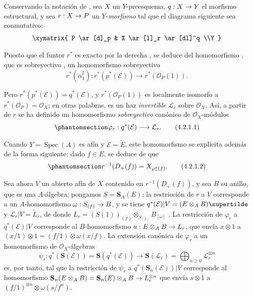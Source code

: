 \documentclass[oneside,10pt]{amsart}
\makeatletter
\renewcommand{\geq}{\geqslant}
\newcommand{\ega@arrow}[2]{\mathchoice{#1}{#2}{#2}{#2}}
\renewcommand{\to}{\ega@arrow{\longrightarrow}{\rightarrow}}
\newcommand{\oldpage}[2][]{\marginnote{\normalfont\footnotesize\textbf{#1}~|~#2}\ignorespaces}
\let\EGAOriginalLabel\label
\renewcommand{\label}[1]{\phantomsection\EGAOriginalLabel{#1}}
\makeatother
\begin{document}
\begin{env}[4.2.1]
\label{II.4.2.1-fr}
Conservando la notación de , sea $X$ un $Y$-preesquema, $q:X\to Y$ el morfismo estructural, y sea $r:X\to P$ un $Y$-\emph{morfismo} tal que el diagrama siguiente sea conmutativo:
\[
  \xymatrix{
    P \ar[d]_p & X \ar[l]_r \ar[dl]^q
    \\Y
  }
\]
\oldpage[II]{73}

Puesto que el funtor $r^*$ es exacto por la derecha , se deduce del homomorfismo , que es sobreyectivo , un homomorfismo sobreyectivo
\[
  r^*(\alpha_1^\sharp):r^*(p^*(\mathcal{E}))\longrightarrow
  r^*(\mathcal{O}_P(1)).
\]

Pero $r^*(p^*(\mathcal{E}))=q^*(\mathcal{E})$, y $r^*(\mathcal{O}_P(1))$ es localmente isomorfo a $r^*(\mathcal{O}_P)=\mathcal{O}_X$; en otras palabras, es un haz \emph{invertible} $\mathcal{L}_r$ sobre $\mathcal{O}_X$.
Así, a partir de $r$ se ha definido un homomorfismo \emph{sobreyectivo} canónico de $\mathcal{O}_X$-módulos
\[
\label{II.4.2.1.1-fr}
  \varphi_r:q^*(\mathcal{E})\longrightarrow\mathcal{L}_r.
\tag{4.2.1.1}
\]

Cuando $Y=\operatorname{Spec}(A)$ es afín y $\mathcal{E}=\widetilde{E}$, este homomorfismo se explicita además de la forma siguiente: dado $f\in E$, se deduce de  que
\[
\label{II.4.2.1.2-fr}
  r^{-1}(D_+(f))=X_{\varphi_r^\flat(f)}.
\tag{4.2.1.2}
\]

Sea ahora $V$ un abierto afín de $X$ contenido en $r^{-1}(D_+(f))$, y sea $B$ su anillo, que es una $A$-álgebra;
pongamos $S=\mathbf{S}_A(E)$;
la restricción de $r$ a $V$ corresponde a un $A$-homomorfismo $\omega:S_{(f)}\to B$, y se tiene $q^*(\mathcal{E})|V=(E\otimes_A B)\supertilde$ y $\mathcal{L}_r|V=\widetilde{L}_r$, de donde $L_r=(S(1))_{(f)}\otimes_{S_{(f)}}B_{[\omega]}$ .
La restricción de $\varphi_r$ a $q^*(\mathcal{E})|V$ corresponde al $B$-homomorfismo $u:E\otimes_A B\to L_r$, que envía $x\otimes1$ a $(x/1)\otimes1=(f/1)\otimes\omega(x/f)$.
La extensión canónica de $\varphi_r$ a un homomorfismo de $\mathcal{O}_X$-álgebras
\[
  \psi_r:q^*(\mathbf{S}(\mathcal{E}))=
  \mathbf{S}(q^*(\mathcal{E}))\longrightarrow
  \mathbf{S}(\mathcal{L}_r)=\bigoplus_{n\geq0}\mathcal{L}_r^{\otimes n}
\]
es, por tanto, tal que la restricción de $\psi_r$ a $q^*(\mathbf{S}_n(\mathcal{E}))|V$ corresponde al homomorfismo
$\mathbf{S}_n(E\otimes_A B)=\mathbf{S}_n(E)\otimes_A B\to L_r^{\otimes n}$ que envía $s\otimes1$ a $(f/1)^{\otimes n}\otimes\omega(s/f^n)$.
\end{env}
\end{document}
